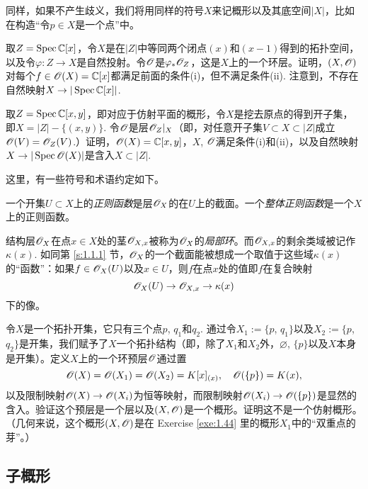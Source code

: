 同样，如果不产生歧义，我们将用同样的符号$X$来记概形以及其底空间$|X|$，比如在构造“令$p\in X$是一个点”中。

\begin{exe}
\begin{compactenum}[(a)]
\item 取$Z=\operatorname{Spec} \mathbb{C}[x]$，令$X$是在$|Z|$中等同两个闭点$(x)$和$(x-1)$得到的拓扑空间，以及令$\varphi:Z\to X$是自然投射。令$\mathscr{O}$是$\varphi_* \mathscr{O}_Z$，这是$X$上的一个环层。证明，$(X,\mathscr{O})$对每个$f\in\mathscr{O}(X)=\mathbb{C}[x]$都满足前面的条件(i)，但不满足条件(ii). 注意到，不存在自然映射$X\to |\operatorname{Spec}\mathbb{C}[x]|$.
\item 取$Z=\operatorname{Spec} \mathbb{C}[x,y]$，即对应于仿射平面的概形，令$X$是挖去原点的得到开子集，即$X=|Z|-\{(x,y)\}$. 令$\mathscr{O}$是层$\mathscr{O}_Z|_X$（即，对任意开子集$V\subset X\subset |Z|$成立$\mathscr{O}(V)=\mathscr{O}_Z(V)$.）证明，$\mathscr{O}(X)=\mathbb{C}[x,y]$，$X$, $\mathscr{O}$满足条件(i)和(ii)，以及自然映射$X\to |\operatorname{Spec}\mathscr{O}(X)|$是含入$X\subset |Z|$.
\end{compactenum}
\end{exe}

这里，有一些符号和术语约定如下。

一个开集$U\subset X$上的\textit{正则函数}是层$\mathscr{O}_X$的在$U$上的截面。一个\textit{整体正则函数}是一个$X$上的正则函数。

结构层$\mathscr{O}_X$在点$x\in X$处的茎$\mathscr{O}_{X,x}$被称为$\mathscr{O}_X$的\textit{局部环}。而$\mathscr{O}_{X,x}$的剩余类域被记作$\kappa(x)$. 如同第 \ref{s:1.1.1} 节，$\mathscr{O}_X$的一个截面能被想成一个取值于这些域$\kappa(x)$的“函数”：如果$f\in\mathscr{O}_X(U)$以及$x\in U$，则$f$在点$x$处的值即$f$在复合映射
\[
	\mathscr{O}_X(U)\to \mathscr{O}_{X,x}\to \kappa(x)
\]
下的像。

\begin{exe}[最小的非仿射概形]
令$X$是一个拓扑开集，它只有三个点$p$, $q_1$和$q_2$. 通过令$X_1:=\{p$, $q_1\}$以及$X_2:=\{p$, $q_2\}$是开集，我们赋予了$X$一个拓扑结构（即，除了$X_1$和$X_2$外，$\varnothing$, $\{p\}$以及$X$本身是开集）。定义$X$上的一个环预层$\mathscr{O}$通过置
\[
	\mathscr{O}(X)=\mathscr{O}(X_1)=\mathscr{O}(X_2)=K[x]_{(x)},\quad \mathscr{O}(\{p\})=K(x),
\]
以及限制映射$\mathscr{O}(X)\to \mathscr{O}(X_i)$为恒等映射，而限制映射$\mathscr{O}(X_i)\to \mathscr{O}(\{p\})$是显然的含入。验证这个预层是一个层以及$(X,\mathscr{O})$是一个概形。证明这不是一个仿射概形。（几何来说，这个概形$(X,\mathscr{O})$是在 Exercise \ref{exe:1.44}  里的概形$X_1$中的“双重点的芽”。）
\end{exe}

\subsection{子概形} \label{s:1.2.1}

